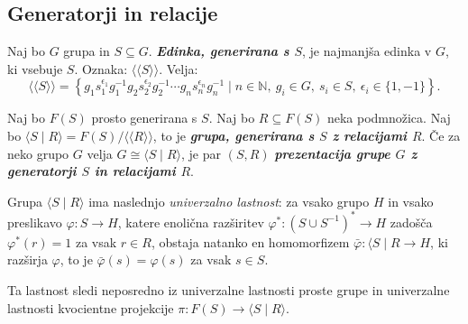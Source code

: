 \documentclass[11pt]{book}
\renewcommand{\llangle}{\langle\langle}
\renewcommand{\rrangle}{\rangle\rangle}
\def\NN{\mathbb{N}}
\def\definicija{\color{rdeca}\bf\em}
\theoremstyle{definition}
\theoremstyle{zgled}
\theoremstyle{odprtproblem}
\theoremstyle{domacanaloga}
\theoremstyle{izrek}
\begin{document}
\subsection{Generatorji in relacije} 

Naj bo $G$ grupa in $S \subseteq G$. {\definicija Edinka, generirana s $S$}, je najmanjša edinka v $G$, ki vsebuje $S$. Oznaka: $\llangle S \rrangle$. Velja:
\[
\llangle S \rrangle = \left\{ g_1 s_1^{\epsilon_1} g_1^{-1} g_2 s_2^{\epsilon_2} g_2^{-1} \cdots g_n s_n^{\epsilon_n} g_n^{-1} \mid n \in \NN, \ g_i \in G, \ s_i \in S, \ \epsilon_i \in \{ 1, -1 \} \right\}.
\]

Naj bo $F(S)$ prosto generirana s $S$. Naj bo $R \subseteq F(S)$ neka podmnožica. Naj bo $\langle S \mid R \rangle = F(S)/\llangle R \rrangle$, to je {\definicija grupa, generirana s $S$ z relacijami $R$}. Če za neko grupo $G$ velja $G \cong \langle S \mid R \rangle$, je par $(S,R)$ {\definicija prezentacija grupe $G$ z generatorji $S$ in relacijami $R$}.

Grupa $\langle S \mid R \rangle$ ima naslednjo {\em univerzalno lastnost}: za vsako grupo $H$ in vsako preslikavo $\varphi \colon S \to H$, katere enolična razširitev $\varphi^* \colon (S \cup S^{-1})^* \to H$ zadošča $\varphi^*(r) = 1$ za vsak $r \in R$, obstaja natanko en homomorfizem $\bar \varphi \colon \langle S \mid R \to H$, ki razširja $\varphi$, to je $\bar \varphi(s) = \varphi(s)$ za vsak $s \in S$. 


Ta lastnost sledi neposredno iz univerzalne lastnosti proste grupe in univerzalne lastnosti kvocientne projekcije $\pi \colon F(S) \to \langle S \mid R \rangle$.
\end{document}
